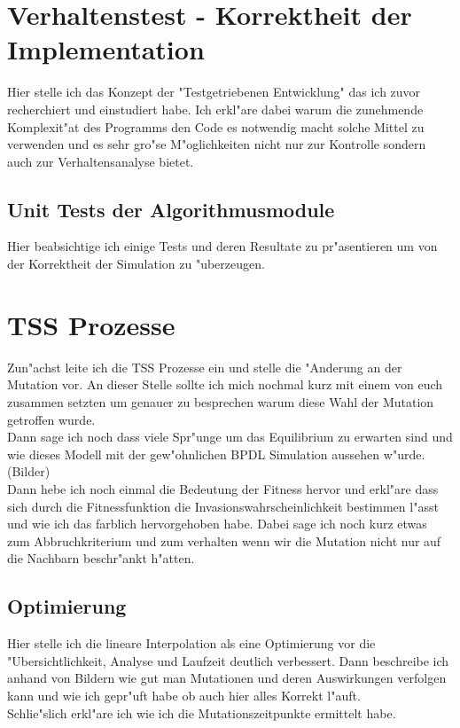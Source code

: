 \documentclass[11pt, a4paper, german]{article}
\begin{document}
\clearpage
\section{Verhaltenstest - Korrektheit der Implementation}
Hier stelle ich das Konzept der "{}Testgetriebenen Entwicklung"{} das ich zuvor recherchiert und einstudiert habe. Ich erkl"are dabei warum die zunehmende Komplexit"at des Programms den Code es notwendig macht solche Mittel zu verwenden und es sehr gro"se M"oglichkeiten nicht nur zur Kontrolle sondern auch zur Verhaltensanalyse bietet.

	\subsection{Unit Tests der Algorithmusmodule}
	Hier beabsichtige ich einige Tests und deren Resultate zu pr"asentieren um von der Korrektheit der Simulation zu "uberzeugen.
	

\clearpage
\section{TSS Prozesse}
Zun"achst leite ich die TSS Prozesse ein und stelle die "Anderung an der Mutation vor. An dieser Stelle sollte ich mich nochmal kurz mit einem von euch zusammen setzten um genauer zu besprechen warum diese Wahl der Mutation getroffen wurde.\\
Dann sage ich noch dass viele Spr"unge um das Equilibrium zu erwarten sind und wie dieses Modell mit der gew"ohnlichen BPDL Simulation aussehen w"urde. (Bilder)\\
Dann hebe ich noch einmal die Bedeutung der Fitness hervor und erkl"are dass sich durch die Fitnessfunktion die Invasionswahrscheinlichkeit bestimmen l"asst und wie ich das farblich hervorgehoben habe. Dabei sage ich noch kurz etwas zum Abbruchkriterium und zum verhalten wenn wir die Mutation nicht nur auf die Nachbarn beschr"ankt h"atten.\\
	\subsection{Optimierung}
	Hier stelle ich die lineare Interpolation als eine Optimierung vor die "Ubersichtlichkeit, Analyse und Laufzeit deutlich verbessert. Dann beschreibe ich anhand von Bildern wie gut man Mutationen und deren Auswirkungen verfolgen kann und wie ich gepr"uft habe ob auch hier alles Korrekt l"auft.\\
	Schlie"slich erkl"are ich wie ich die Mutationszeitpunkte ermittelt habe.
	
\end{document}
